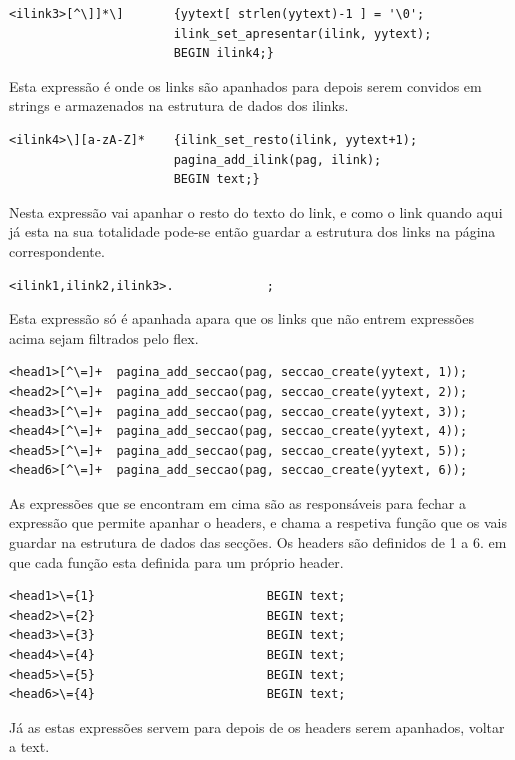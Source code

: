 \documentclass[11pt, a4paper, oneside]{article}
\begin{document}
\begin{verbatim}
<ilink3>[^\]]*\]       {yytext[ strlen(yytext)-1 ] = '\0';
                       ilink_set_apresentar(ilink, yytext);
                       BEGIN ilink4;}
\end{verbatim}
Esta expressão é onde os links são apanhados para depois serem convidos em strings e armazenados na estrutura de dados dos ilinks.

\begin{verbatim}
<ilink4>\][a-zA-Z]*    {ilink_set_resto(ilink, yytext+1);
                       pagina_add_ilink(pag, ilink);
                       BEGIN text;}
\end{verbatim}

Nesta expressão vai apanhar o resto do texto do link, e como o link quando aqui já esta na sua totalidade pode-se então guardar a estrutura dos links na página correspondente.


\begin{verbatim}
<ilink1,ilink2,ilink3>.             ;
\end{verbatim}
Esta expressão só é apanhada apara que os links que não entrem expressões acima sejam filtrados pelo flex. 



\begin{verbatim}
<head1>[^\=]+  pagina_add_seccao(pag, seccao_create(yytext, 1));
<head2>[^\=]+  pagina_add_seccao(pag, seccao_create(yytext, 2));
<head3>[^\=]+  pagina_add_seccao(pag, seccao_create(yytext, 3));
<head4>[^\=]+  pagina_add_seccao(pag, seccao_create(yytext, 4));
<head5>[^\=]+  pagina_add_seccao(pag, seccao_create(yytext, 5));
<head6>[^\=]+  pagina_add_seccao(pag, seccao_create(yytext, 6));
\end{verbatim}
As expressões que se encontram em cima são as responsáveis para fechar a expressão que permite apanhar o headers, e chama a respetiva função que os vais guardar na estrutura de dados das secções. Os headers são definidos de 1 a 6. em que cada função esta definida para um próprio header. 

\begin{verbatim}
<head1>\={1}                        BEGIN text;
<head2>\={2}                        BEGIN text;
<head3>\={3}                        BEGIN text;
<head4>\={4}                        BEGIN text;
<head5>\={5}                        BEGIN text;
<head6>\={4}                        BEGIN text;

\end{verbatim}
Já as estas expressões servem para depois de os headers serem apanhados, voltar a text.
\end{document}
